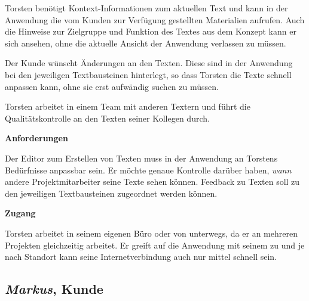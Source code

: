 \begin{multicols}{2}
Torsten benötigt Kontext-Informationen zum aktuellen Text und kann in der Anwendung die vom Kunden zur Verfügung gestellten Materialien aufrufen. Auch die Hinweise zur Zielgruppe und Funktion des Textes aus dem Konzept kann er sich ansehen, ohne die aktuelle Ansicht der Anwendung verlassen zu müssen.

Der Kunde wünscht Änderungen an den Texten. Diese sind in der Anwendung bei den jeweiligen Textbausteinen hinterlegt, so dass Torsten die Texte schnell anpassen kann, ohne sie erst aufwändig suchen zu müssen.

Torsten arbeitet in einem Team mit anderen Textern und führt die Qualitätskontrolle an den Texten seiner Kollegen durch.

\textbf{Anforderungen}

Der Editor zum Erstellen von Texten muss in der Anwendung an Torstens Bedürfnisse anpassbar sein. Er möchte genaue Kontrolle darüber haben, \emph{wann} andere Projektmitarbeiter seine Texte sehen können. Feedback zu Texten soll zu den jeweiligen Textbausteinen zugeordnet werden können.

\textbf{Zugang}

Torsten arbeitet in seinem eigenen Büro oder von unterwegs, da er an mehreren Projekten gleichzeitig arbeitet. Er greift auf die Anwendung mit seinem  zu und je nach Standort kann seine Internetverbindung auch nur mittel schnell sein.

\end{multicols}

\pagebreak

\subsection{\emph{Markus}, Kunde}\label{p:markus}

